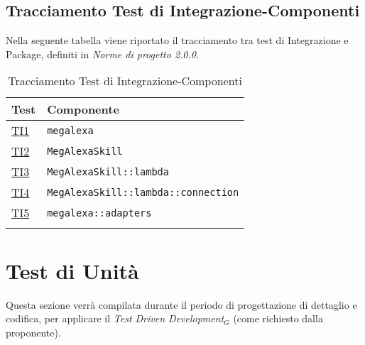 \subsection{Tracciamento Test di Integrazione-Componenti}
Nella seguente tabella viene riportato il tracciamento tra test di Integrazione e Package, definiti in \textit{Norme di progetto 2.0.0}.
\normalsize
\begin{longtable}{|>{\centering}m{3cm}|m{9cm}<{\centering}|}
\hline
\textbf{Test} & \textbf{Componente}\\
\hline
\endhead
\hyperlink{TI1}{TI1} & \texttt{megalexa}\\ \hline
\hyperlink{TI2}{TI2} & {\texttt{MegAlexaSkill}}\\ \hline
\hyperlink{TI3}{TI3} & {\texttt{MegAlexaSkill::lambda}}\\ \hline
\hyperlink{TI4}{TI4} & {\texttt{MegAlexaSkill::lambda::connection}}\\ \hline
\hyperlink{TI5}{TI5} & {\texttt{megalexa::adapters}}\\ \hline
\caption[Tracciamento Test di Integrazione-Componenti]{Tracciamento Test di Integrazione-Componenti}
\label{tabella:ts-requi}
\end{longtable}

\section{Test di Unità}
Questa sezione verrà compilata durante il periodo di progettazione di dettaglio e codifica, per applicare il \textit{Test Driven Development$_{G}$} (come richiesto dalla proponente).